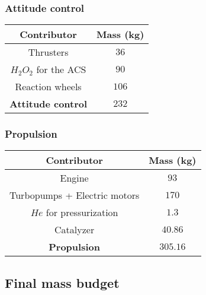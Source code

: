 \subsubsection{Attitude control}
\begin{center}
\begin{tabular}[H]{|c|c|}
	\hline
	\cellcolor{gray!50}Contributor & \cellcolor{gray!50}Mass (kg)\\
	\hline
	Thrusters & $36$\\
	\hline
	$H_2O_2$ for the ACS & $90$\\
	\hline
	
	Reaction wheels & $106$\\
	\hline
	\cellcolor{green!30}\textbf{Attitude control} & \textbf{$232$}\\
	\hline
\end{tabular}
\end{center}
\subsubsection{Propulsion}
\begin{center}
\begin{tabular}[H]{|c|c|}
	\hline
	\cellcolor{gray!50}Contributor & \cellcolor{gray!50}Mass (kg)\\
	\hline
	Engine & $93$\\
	\hline
	Turbopumps + Electric motors & $170$\\
	\hline
	$He$ for pressurization & $1.3$\\
	\hline
	Catalyzer & $40.86$\\
	\hline
	\cellcolor{green!30}\textbf{Propulsion} & \textbf{$305.16$}\\
	\hline
\end{tabular}
\end{center}
\subsection{Final mass budget}

